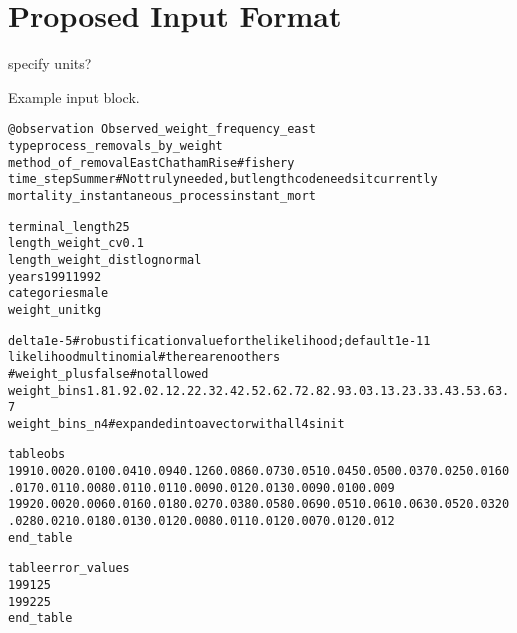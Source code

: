 \documentclass[a4paper,11pt,twoside,pdftex,draft]{article}
\begin{document}
\section{Proposed Input Format}


specify units?

Example input block.

\begin{alltt}
\texttt{@observation Observed\_weight\_frequency\_east}
type process\_removals\_by\_weight
method\_of\_removal EastChathamRise  # fishery
time\_step Summer # Not truly needed, but length code needs it currently
mortality\_instantaneous\_process instant\_mort

terminal\_length  25
length\_weight\_cv 0.1
length\_weight\_dist lognormal
years 1991 1992
categories male
weight\_unit kg

delta 1e-5  # robustification value for the likelihood; default 1e-11
likelihood multinomial	#there are no others
#weight\_plus false        #not allowed
weight\_bins 1.8 1.9 2.0 2.1 2.2 2.3 2.4 2.5 2.6 2.7 2.8 2.9 3.0 3.1 3.2 3.3 3.4 3.5 3.6 3.7 % 3.8 3.9 4.0 4.1 4.2 4.3 4.4 4.5 4.6 4.7 4.8 4.9 5.0 5.1 5.2 5.3 5.4 5.5 5.6 5.7 5.8 5.9 6.0 6.1 6.2 6.3 6.4 6.5 6.6 6.7 6.8 6.9 7.0 7.1 7.2 7.3 7.4 7.5 7.6 7.7 7.8 7.9 8.0 8.1 8.2 8.3 8.4 8.5 8.6 8.7 8.8 8.9 9.0 9.1 9.2 9.3 9.4 9.5 9.6 9.7 9.8 9.9 10.0 10.1 10.2 10.3 10.4 10.5 10.6 10.7 10.8 10.9 11.0 11.1 11.2 11.3 11.4 11.5 11.6 11.7 11.8
weight_bins_n   4    #expanded into a vector with all 4s in it

table obs
1991 0.002 0.010 0.041 0.094 0.126 0.086 0.073 0.051 0.045 0.050 0.037 0.025 0.016 0.017 0.011 0.008 0.011 0.011 0.009 0.012 0.013 0.009 0.010 0.009 % 0.0100.0070.0080.0060.0050.0100.0080.0140.0080.0120.0060.0070.0090.0050.0070.0060.0040.0060.0040.0040.0070.0050.0020.0060.0040.0030.0040.0020.0040.0030.0020.0020.0020.0010.0020.0030.0010.0020.0010.0010.0010.0010.0010.0010.0010.0000.0010.0010.0000.0010.0010.0010.0010.0000.0010.0010.0010.0010.0010.0010.0000.0010.0000.0010.0000.0000.0010.0000.0000.0000.0000.0000.0000.0000.0000.001
1992 0.002 0.006 0.016 0.018 0.027 0.038 0.058 0.069 0.051 0.061 0.063 0.052 0.032 0.028 0.021 0.018 0.013 0.012 0.008 0.011 0.012 0.007 0.012 0.012 % 0.0150.0070.0090.0110.0090.0100.0140.0130.0120.0190.0110.0130.0130.0090.0100.0140.0080.0090.0060.0060.0080.0080.0050.0080.0070.0060.0030.0060.0060.0040.0020.0040.0070.0030.0040.0030.0020.0030.0020.0020.0020.0020.0020.0020.0020.0020.0020.0010.0010.0010.0020.0020.0010.0020.0020.0020.0010.0010.0010.0020.0010.0010.0010.0010.0010.0000.0010.0010.0000.0010.0010.0000.0000.0010.0000.001
end\_table

table error\_values
1991 25
1992 25
end\_table
\end{alltt}
\end{document}
